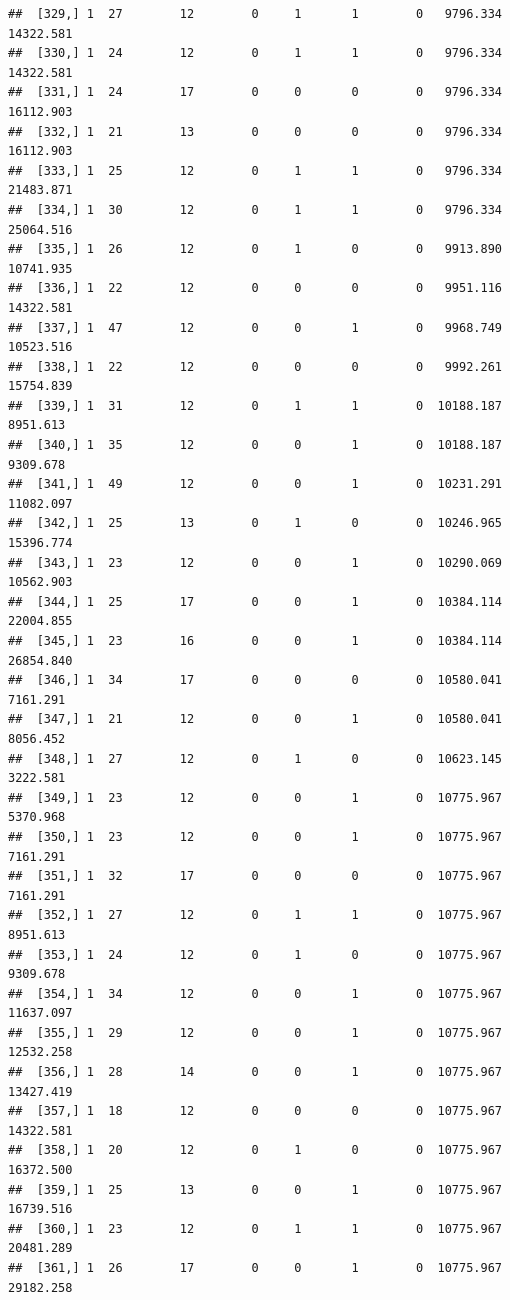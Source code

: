 \documentclass[
]{article}
\begin{document}
\begin{verbatim}
##  [329,] 1  27        12        0     1       1        0   9796.334  14322.581
##  [330,] 1  24        12        0     1       1        0   9796.334  14322.581
##  [331,] 1  24        17        0     0       0        0   9796.334  16112.903
##  [332,] 1  21        13        0     0       0        0   9796.334  16112.903
##  [333,] 1  25        12        0     1       1        0   9796.334  21483.871
##  [334,] 1  30        12        0     1       1        0   9796.334  25064.516
##  [335,] 1  26        12        0     1       0        0   9913.890  10741.935
##  [336,] 1  22        12        0     0       0        0   9951.116  14322.581
##  [337,] 1  47        12        0     0       1        0   9968.749  10523.516
##  [338,] 1  22        12        0     0       0        0   9992.261  15754.839
##  [339,] 1  31        12        0     1       1        0  10188.187   8951.613
##  [340,] 1  35        12        0     0       1        0  10188.187   9309.678
##  [341,] 1  49        12        0     0       1        0  10231.291  11082.097
##  [342,] 1  25        13        0     1       0        0  10246.965  15396.774
##  [343,] 1  23        12        0     0       1        0  10290.069  10562.903
##  [344,] 1  25        17        0     0       1        0  10384.114  22004.855
##  [345,] 1  23        16        0     0       1        0  10384.114  26854.840
##  [346,] 1  34        17        0     0       0        0  10580.041   7161.291
##  [347,] 1  21        12        0     0       1        0  10580.041   8056.452
##  [348,] 1  27        12        0     1       0        0  10623.145   3222.581
##  [349,] 1  23        12        0     0       1        0  10775.967   5370.968
##  [350,] 1  23        12        0     0       1        0  10775.967   7161.291
##  [351,] 1  32        17        0     0       0        0  10775.967   7161.291
##  [352,] 1  27        12        0     1       1        0  10775.967   8951.613
##  [353,] 1  24        12        0     1       0        0  10775.967   9309.678
##  [354,] 1  34        12        0     0       1        0  10775.967  11637.097
##  [355,] 1  29        12        0     0       1        0  10775.967  12532.258
##  [356,] 1  28        14        0     0       1        0  10775.967  13427.419
##  [357,] 1  18        12        0     0       0        0  10775.967  14322.581
##  [358,] 1  20        12        0     1       0        0  10775.967  16372.500
##  [359,] 1  25        13        0     0       1        0  10775.967  16739.516
##  [360,] 1  23        12        0     1       1        0  10775.967  20481.289
##  [361,] 1  26        17        0     0       1        0  10775.967  29182.258

\end{verbatim}
\end{document}
